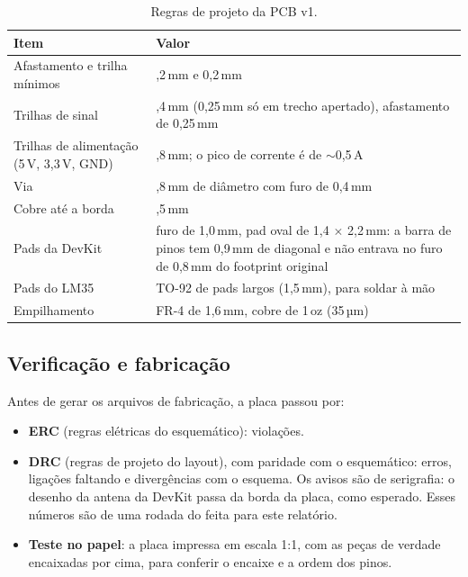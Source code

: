 \begin{table}[H]
\centering
\caption{Regras de projeto da PCB v1.}
\label{tab:regras_pcb}
\small
\begin{tabular}{@{}>{\raggedright\arraybackslash}p{6.2cm}>{\raggedright\arraybackslash}p{7.6cm}@{}}
\toprule
Item & Valor \\
\midrule
Afastamento e trilha mínimos & 0,2\,mm e 0,2\,mm \\
Trilhas de sinal & 0,4\,mm (0,25\,mm só em trecho apertado), afastamento de 0,25\,mm \\
Trilhas de alimentação (5\,V, 3,3\,V, GND) & 0,8\,mm; o pico de corrente é de $\sim$0,5\,A \\
Via & 0,8\,mm de diâmetro com furo de 0,4\,mm \\
Cobre até a borda & 0,5\,mm \\
Pads da DevKit & furo de 1,0\,mm, pad oval de 1,4 $\times$ 2,2\,mm: a barra de pinos tem 0,9\,mm de diagonal e não entrava no furo de 0,8\,mm do footprint original \\
Pads do LM35 & TO-92 de pads largos (1,5\,mm), para soldar à mão \\
Empilhamento & FR-4 de 1,6\,mm, cobre de 1\,oz (35\,µm) \\
\bottomrule
\end{tabular}
\end{table}

\subsection{Verificação e fabricação}

Antes de gerar os arquivos de fabricação, a placa passou por:
\begin{itemize}
  \item \textbf{ERC} (regras elétricas do esquemático): \ercViolacoes{} violações.
  \item \textbf{DRC} (regras de projeto do layout), com paridade com o esquemático:
        \drcErros{} erros, \drcSemLigacao{} ligações faltando e \drcParidade{} divergências
        com o esquema. Os \drcAvisos{} avisos são de serigrafia: o desenho da antena da DevKit
        passa da borda da placa, como esperado. Esses números são de uma rodada do
         feita para este relatório.
  \item \textbf{Teste no papel}: a placa impressa em escala 1:1, com as peças de verdade
        encaixadas por cima, para conferir o encaixe e a ordem dos pinos.
\end{itemize}


